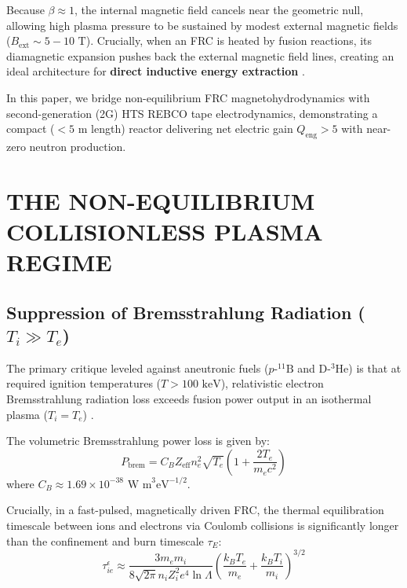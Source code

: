 \documentclass[10pt,twocolumn]{article}
\begin{document}
Because $\beta \approx 1$, the internal magnetic field cancels near the geometric null, allowing high plasma pressure to be sustained by modest external magnetic fields ($B_{\text{ext}} \sim 5 - 10\text{ T}$). Crucially, when an FRC is heated by fusion reactions, its diamagnetic expansion pushes back the external magnetic field lines, creating an ideal architecture for \textbf{direct inductive energy extraction} \cite{Miley1992}.

In this paper, we bridge non-equilibrium FRC magnetohydrodynamics with second-generation (2G) HTS REBCO tape electrodynamics, demonstrating a compact ($< 5\text{ m}$ length) reactor delivering net electric gain $Q_{\text{eng}} > 5$ with near-zero neutron production.



\section{THE NON-EQUILIBRIUM COLLISIONLESS PLASMA REGIME}


\subsection{Suppression of Bremsstrahlung Radiation ($T_i \gg T_e$)}

The primary critique leveled against aneutronic fuels ($p\text{-}^{11}\text{B}$ and $\text{D}\text{-}^3\text{He}$) is that at required ignition temperatures ($T > 100\text{ keV}$), relativistic electron Bremsstrahlung radiation loss exceeds fusion power output in an isothermal plasma ($T_i = T_e$) \cite{Rider1995}.

The volumetric Bremsstrahlung power loss is given by:
\begin{equation}
  P_{\text{brem}} = C_B Z_{\text{eff}} n_e^2 \sqrt{T_e} \left( 1 + \frac{2 T_e}{m_e c^2} \right)
\end{equation}
where $C_B \approx 1.69 \times 10^{-38}\text{ W m}^3 \text{eV}^{-1/2}$.

Crucially, in a fast-pulsed, magnetically driven FRC, the thermal equilibration timescale between ions and electrons via Coulomb collisions is significantly longer than the confinement and burn timescale $\tau_E$:
\begin{equation}
  \tau_{ie}^\epsilon \approx \frac{3 m_e m_i}{8 \sqrt{2\pi} n_i Z_i^2 e^4 \ln \Lambda} \left( \frac{k_B T_e}{m_e} + \frac{k_B T_i}{m_i} \right)^{3/2}
\end{equation}
\end{document}
